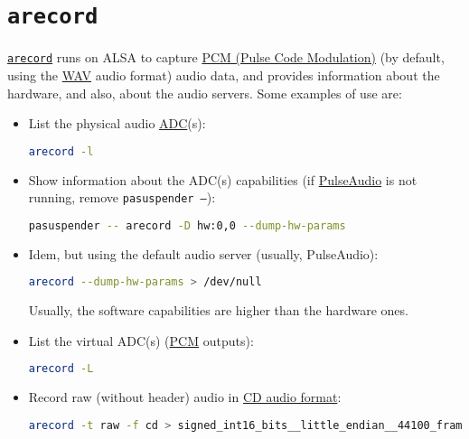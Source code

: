 \section{\texttt{arecord}}
\texttt{\href{https://linux.die.net/man/1/arecord}{arecord}} runs on
ALSA to capture
\href{https://en.wikipedia.org/wiki/Pulse-code_modulation}{PCM (Pulse
  Code Modulation)} (by default, using the
\href{https://en.wikipedia.org/wiki/WAV}{WAV} audio format) audio
data, and provides information about the hardware, and also, about the
audio servers. Some examples of use are:

\begin{itemize}

\item List the physical audio
  \href{https://en.wikipedia.org/wiki/Analog-to-digital_converter}{ADC}(s):
\begin{lstlisting}[language=Bash]
arecord -l      
\end{lstlisting}

\item Show information about the ADC(s) capabilities (if
  \href{https://www.freedesktop.org/wiki/Software/PulseAudio/}{PulseAudio}
  is not running, remove \texttt{pasuspender --}):
\begin{lstlisting}[language=Bash]
pasuspender -- arecord -D hw:0,0 --dump-hw-params
\end{lstlisting}

\item Idem, but using the default audio server (usually, PulseAudio):
\begin{lstlisting}[language=Bash]
arecord --dump-hw-params > /dev/null
\end{lstlisting}
Usually, the software capabilities are higher than the hardware ones.

\item List the virtual ADC(s)
  (\href{https://alsa.opensrc.org/Pcm-device}{PCM} outputs):
\begin{lstlisting}[language=Bash]
arecord -L
\end{lstlisting}

\item Record raw (without header) audio in
  \href{https://en.wikipedia.org/wiki/Compact_Disc_Digital_Audio#Audio_format}{CD
    audio format}:
\begin{lstlisting}[language=Bash]
arecord -t raw -f cd > signed_int16_bits__little_endian__44100_frames_per_second__2_samples_per_frame.raw
\end{lstlisting}

\end{itemize}

